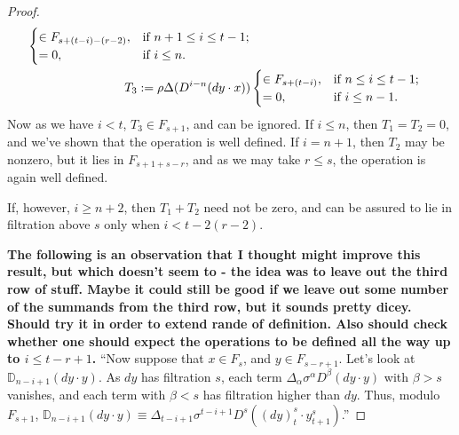 \documentclass[10pt]{article}
\newcommand{\twist}{\sigma}
\begin{document}
\begin{AdamsSSEQ operations final}
\begin{proof}
\begin{align*}
\begin{cases}
\in F_{s+(t-i)-(r-2)},&\textup{if }n+1\leq i\leq t-1;\\
=0,&\textup{if }i\leq n.
\end{cases}
\\
T_3:=\rho\Delta(D^{i-n}(dy\cdot x))&\begin{cases}
\in F_{s+(t-i)},&\textup{if }n\leq i\leq t-1;\\
=0,&\textup{if }i\leq n-1.
\end{cases}
\end{align*}
Now as we have $i<t$, $T_3\in F_{s+1}$, and can be ignored. If $i\leq n$, then $T_1=T_2=0$, and we've shown that the operation is well defined. If $i=n+1$, then $T_2$ may be nonzero, but it lies in $F_{s+1+s-r}$, and as we may take $r\leq s$, the operation is again well defined.

If, however, $i\geq n+2$, then $T_1+T_2$ need not be zero, and can be assured to lie in filtration above $s$ only when $i<t-2(r-2)$.

\textbf{The following is an observation that I thought might improve this result, but which doesn't seem to - the idea was to leave out the third row of stuff. Maybe it could still be good if we leave out some number of the summands from the third row, but it sounds pretty dicey. Should try it in order to extend rande of definition. Also should check whether one should expect the operations to be defined all the way up to $i\leq t-r+1$.} ``Now suppose that $x\in F_s$, and $y\in F_{s-r+1}$. Let's look at $\mathbb{D}_{n-i+1}(dy\cdot y)$. As $dy$ has filtration $s$, each term $\Delta_{\alpha}\sigma^{\alpha}D^\beta(dy\cdot y)$ with $\beta>s$ vanishes, and each term with $\beta<s$ has filtration higher than $dy$. Thus, modulo $F_{s+1}$, $\mathbb{D}_{n-i+1}(dy\cdot y)\equiv\Delta_{t-i+1}\twist^{t-i+1}D^s((dy)^s_{t}\cdot y^{s}_{t+1})$.''
\end{proof}




\end{AdamsSSEQ operations final}
\end{document}
